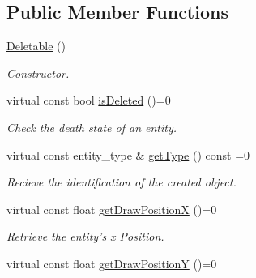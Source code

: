 \subsection*{Public Member Functions}
\begin{DoxyCompactItemize}
\item 
\hypertarget{class_deletable_a0ffa30c5232f87be98552a0dc90ab4ef}{\hyperlink{class_deletable_a0ffa30c5232f87be98552a0dc90ab4ef}{Deletable} ()}\label{class_deletable_a0ffa30c5232f87be98552a0dc90ab4ef}

\begin{DoxyCompactList}\small\item\em Constructor. \end{DoxyCompactList}\item 
\hypertarget{class_deletable_a6572440c291077cf52bf21288c6cd25c}{virtual const bool \hyperlink{class_deletable_a6572440c291077cf52bf21288c6cd25c}{is\+Deleted} ()=0}\label{class_deletable_a6572440c291077cf52bf21288c6cd25c}

\begin{DoxyCompactList}\small\item\em Check the death state of an entity. \end{DoxyCompactList}\item 
\hypertarget{class_deletable_af8a0208abc297180873692f4215fe50f}{virtual const entity\+\_\+type \& \hyperlink{class_deletable_af8a0208abc297180873692f4215fe50f}{get\+Type} () const =0}\label{class_deletable_af8a0208abc297180873692f4215fe50f}

\begin{DoxyCompactList}\small\item\em Recieve the identification of the created object. \end{DoxyCompactList}\item 
\hypertarget{class_deletable_ac14ea0c5986d50ba3ba454f89c87b8fe}{virtual const float \hyperlink{class_deletable_ac14ea0c5986d50ba3ba454f89c87b8fe}{get\+Draw\+Position\+X} ()=0}\label{class_deletable_ac14ea0c5986d50ba3ba454f89c87b8fe}

\begin{DoxyCompactList}\small\item\em Retrieve the entity's x Position. \end{DoxyCompactList}\item 
\hypertarget{class_deletable_a2a88d7e40c56902a3d3d8f668e9d126d}{virtual const float \hyperlink{class_deletable_a2a88d7e40c56902a3d3d8f668e9d126d}{get\+Draw\+Position\+Y} ()=0}\label{class_deletable_a2a88d7e40c56902a3d3d8f668e9d126d}


\end{DoxyCompactItemize}
